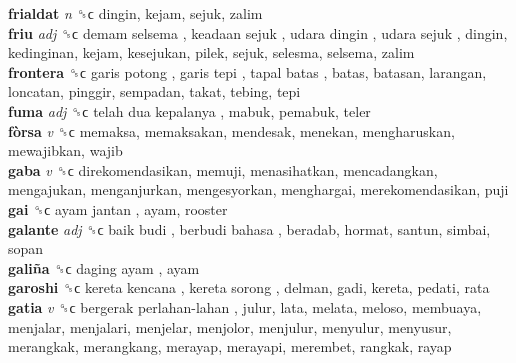 \textbf{frialdat} \emph{n}  ␝ϲ  dingin, kejam, sejuk, zalim  \\
\textbf{friu} \emph{adj}  ␝ϲ   demam selsema ,  keadaan sejuk ,  udara dingin ,  udara sejuk , dingin, kedinginan, kejam, kesejukan, pilek, sejuk, selesma, selsema, zalim  \\
\textbf{frontera} ␝ϲ   garis potong ,  garis tepi ,  tapal batas , batas, batasan, larangan, loncatan, pinggir, sempadan, takat, tebing, tepi  \\
\textbf{fuma} \emph{adj}  ␝ϲ   telah dua kepalanya , mabuk, pemabuk, teler  \\
\textbf{fòrsa} \emph{v}  ␝ϲ  memaksa, memaksakan, mendesak, menekan, mengharuskan, mewajibkan, wajib  \\
\textbf{gaba} \emph{v}  ␝ϲ  direkomendasikan, memuji, menasihatkan, mencadangkan, mengajukan, menganjurkan, mengesyorkan, menghargai, merekomendasikan, puji  \\
\textbf{gai} ␝ϲ   ayam jantan , ayam, rooster  \\
\textbf{galante} \emph{adj}  ␝ϲ   baik budi ,  berbudi bahasa , beradab, hormat, santun, simbai, sopan  \\
\textbf{galiña} ␝ϲ   daging ayam , ayam  \\
\textbf{garoshi} ␝ϲ   kereta kencana ,  kereta sorong , delman, gadi, kereta, pedati, rata  \\
\textbf{gatia} \emph{v}  ␝ϲ   bergerak perlahan-lahan , julur, lata, melata, meloso, membuaya, menjalar, menjalari, menjelar, menjolor, menjulur, menyulur, menyusur, merangkak, merangkang, merayap, merayapi, merembet, rangkak, rayap  \\

